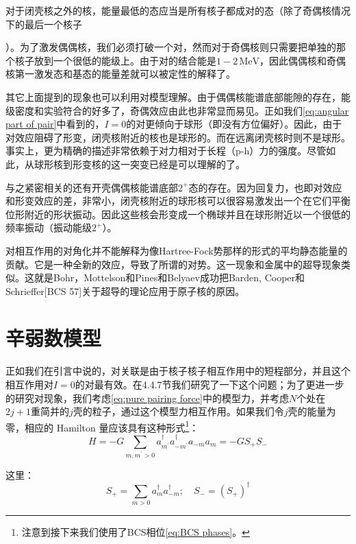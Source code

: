 对于闭壳核之外的核，能量最低的态应当是所有核子都成对的态（除了奇偶核情况下的最后一个核子

）。为了激发偶偶核，我们必须打破一个对，然而对于奇偶核则只需要把单独的那个核子放到一个很低的能级上。由于对的结合能是$1-2\,\text{MeV}$，因此偶偶核和奇偶核第一激发态和基态的能量差就可以被定性的解释了。

其它上面提到的现象也可以利用对模型理解。由于偶偶核能谱底部能隙的存在，能级密度和实验符合的好多了，奇偶效应由此也非常显而易见。正如我们\ref{eq:angular part of pair}中看到的，$I=0$的对更倾向于球形（即没有方位偏好）。因此，由于对效应阻碍了形变，闭壳核附近的核也是球形的。而在远离闭壳核时则不是球形。事实上，更为精确的描述非常依赖于对力相对于长程（p-h）力的强度。尽管如此，从球形核到形变核的这一突变已经是可以理解的了。

与之紧密相关的还有开壳偶偶核能谱底部$2^{+}$态的存在。因为回复力，也即对效应和形变效应的差，非常小，闭壳核附近的球形核可以很容易激发出一个在它们平衡位形附近的形状振动。因此这些核会形变成一个椭球并且在球形附近以一个很低的频率振动（振动能级$2^{+}$）。

对相互作用的对角化并不能解释为像Hartree-Fock势那样的形式的平均静态能量的贡献。它是一种全新的效应，导致了所谓的对势。这一现象和金属中的超导现象类似。这就是Bohr，Mottelson和Pines\cite{BMP58}和Belyaev\cite{Be59}成功把Barden,
Cooper和Schrieffer{[}BCS 57{]}关于超导的理论应用于原子核的原因。

\section{辛弱数模型\label{sec:6.2_Seniority=0065B9=006848}}

正如我们在引言中说的，对关联是由于核子核子相互作用中的短程部分，并且这个相互作用对$I=0$的对最有效。在4.4.7节我们研究了一下这个问题；为了更进一步的研究对现象，我们考虑\ref{eq:pure pairing force}中的模型力，并考虑$N$个处在$2j+1$重简并的$j$壳的粒子，通过这个模型力相互作用。如果我们令$j$壳的能量为零，相应的
Hamilton 量应该具有这种形式\footnote{注意到接下来我们使用了BCS相位\ref{eq:BCS phases}。}：
\begin{equation}
H=-G\sum_{m,m^{\prime}>0}a^{\dagger}_{m^{\prime}}a^{\dagger}_{-m^{\prime}}a_{-m}a_{m}=-GS_{+}S_{-}\label{eq:Seniority Hamiltonian}
\end{equation}

这里：
\begin{equation}
S_{+}=\sum_{m>0}a^{\dagger}_{m}a^{\dagger}_{-m};\quad S_{-}=(S_{+})^{\dagger}\label{eq:quasi spin ladder operator}
\end{equation}

